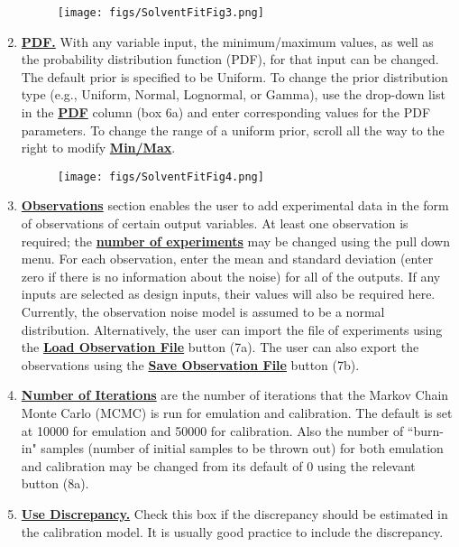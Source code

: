 \documentclass[12pt]{article}
\newcommand{\bu}[1] {\textbf{ \underline{#1}}}
\begin{document}
\begin{enumerate}
\begin{figure}[h!]
\centering \texttt{[image: figs/SolventFitFig3.png]}
\label{fig:SolventFit_Fig_3}
\end{figure}

\item \bu{PDF.} With any variable input, the minimum/maximum values, as well as the probability distribution function (PDF), for that input can be changed.  The default prior is specified to be Uniform.   To change the prior distribution type (e.g.,  Uniform, Normal, Lognormal, or Gamma), use the drop-down list in the \textbf{\underline{PDF}} column (box 6a) and enter corresponding values for the PDF parameters. To change the range of a uniform prior, scroll all the way to the right to modify \textbf{\underline{Min/Max}}. 

\begin{figure}[h!]
\centering \texttt{[image: figs/SolventFitFig4.png]}
\label{fig:SolventFit_Fig_4}
\end{figure}

\item \bu{Observations} section enables the user to add experimental data in the form of observations of certain output variables.
   At least one observation is required; the \bu{number of experiments} may be changed using the pull down menu.  For each observation, enter the mean and standard deviation (enter zero if there is no information about the noise) for all of the outputs.  If any inputs are selected as design inputs, their values will also be required here.  Currently, the observation noise model is assumed to be a normal distribution.  
Alternatively, the user can import the file of experiments using the \bu{Load Observation File} button (7a).  The user can also export the observations using the \bu{Save Observation File} button (7b).    

\item \bu{Number of Iterations} are the number of iterations that the Markov Chain Monte Carlo (MCMC) is run for emulation and calibration.  The default is set at 10000 for emulation and 50000 for calibration.  Also the number of ``burn-in" samples (number of initial samples to be thrown out) for both emulation and calibration may be changed from its default of 0 using the relevant button (8a).   

\item \bu{Use Discrepancy.}  Check this box if the discrepancy should be estimated in the calibration model.  It is usually good practice to include the discrepancy.


\end{enumerate}
\end{document}
